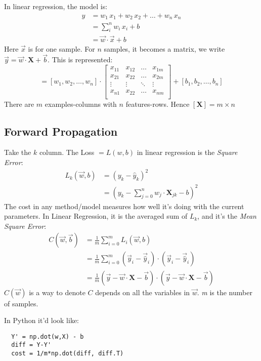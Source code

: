 In linear regression, the model is:
\begin{align*}
 y &= w_1\, x_1 + w_2\, x_2 +\ldots+ w_n\, x_n\\
   &= \sum_i^n w_i\, x_i + b \\
   &= \vec{w}\cdot\vec{x} + b
\end{align*}
Here $\vec{x}$ is for one sample. For $n$ samples, it becomes a matrix, we write $\vec{y} = \vec{w}\cdot\mathbf{X} + \vec{b}$. This is represented:
\begin{equation}
  [y_1, y_2, \ldots, y_n] = 
  [w_1, w_2, \ldots, w_n] \cdot
  \begin{bmatrix}
    x_{11} & x_{12} & \ldots & x_{1m}\\
    x_{21} & x_{22} & \ldots & x_{2m}\\
    \vdots & \vdots & \ddots & \vdots\\
    x_{n1} & x_{22} & \ldots & x_{nm}\\
  \end{bmatrix}
  + [b_1, b_2, \ldots, b_n]
\end{equation}
There are $m$ examples-columns with $n$ features-rows. Hence $[\mathbf{X}] = m\times{}n$

\subsection{Forward Propagation}
Take the $k$ column. The Loss $= L(w,b)$ in linear regression is the \textit{Square Error}:
\begin{align*}
  L_k(\vec{w},b) &= (y_k - \hat{y}_k)^2\\
  &= (y_k - \sum_{j=0}^n w_j\cdot{}{\mathbf{X}}_{jk} - b)^2
\end{align*}
The cost in any method/model measures how well it's doing with the current parameters. In Linear Regression, it is the averaged sum of $L_k$, and it's the \textit{Mean Square Error}:
\begin{align}
  C(\vec{w}, \vec{b}) &= \frac{1}{m}\sum_{i=0}^m L_i(\vec{w}, b)\\
  &=\frac{1}{m}\sum_{i=0}^m (\vec{y}_i - \vec{\hat{y}}_i)\cdot{}(\vec{y}_i - \vec{\hat{y}}_i)\\
  &= \frac{1}{m} (\vec{y} - \vec{w}\cdot{}\mathbf{X} - \vec{b})\cdot{}(\vec{y} - \vec{w}\cdot{}\mathbf{X} - \vec{b})
\end{align}
$C(\vec{w})$ is a way to denote $C$ depends on all the variables in $\vec{w}$. \textit{m} is the number of samples.

In Python it'd look like:
\begin{center}
  \begin{BVerbatim}
  Y' = np.dot(w,X) - b
  diff = Y-Y' 
  cost = 1/m*np.dot(diff, diff.T)
  \end{BVerbatim}
\end{center}
